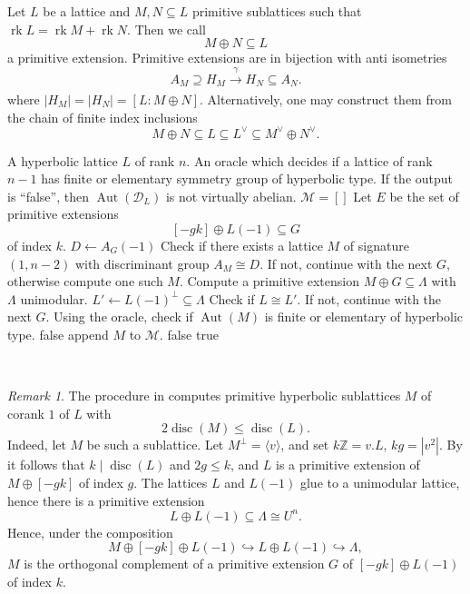 \documentclass[11pt,letterpaper]{amsart}
\DeclareMathOperator{\rk}{rk}
\DeclareMathOperator{\Aut}{Aut}
\DeclareMathOperator{\disc}{disc}
\newcommand{\ZZ}{\mathbb{Z}}
\theoremstyle{definition}
\theoremstyle{remark}
\newtheorem{remark}[theorem]{Remark}
\begin{document}
Let $L$ be a lattice and $M,N \subseteq L$ primitive sublattices such that $\rk L = \rk M+ \rk N$. 
Then we call 
\[M\oplus N \subseteq L\]
a primitive extension. Primitive extensions are in bijection with anti isometries
\[A_M \supseteq H_M \xrightarrow[]{\gamma} H_N \subseteq A_N.\]
where $|H_M|=|H_N|=[L:M \oplus N]$.
Alternatively, one may construct them from the chain of finite index inclusions 
\[M\oplus N \subseteq L \subseteq L^\vee \subseteq M^\vee \oplus N^\vee.\]
\begingroup
{}\label{alg:sublattice}
\endgroup
\begin{algorithmic}[1]
\REQUIRE A hyperbolic lattice $L$ of rank $n$. An oracle which decides if a lattice of rank $n-1$ has finite or elementary symmetry group of hyperbolic type. 
\ENSURE If the output is ``false'', then $\Aut(\mathcal{D}_L)$ is not virtually abelian.
 \STATE $\mathcal{M} = []$
 \FOR{$k \mid \disc(L)$}
   \STATE Let $E$ be the set of primitive extensions
   \[[-gk]\oplus L(-1) \subseteq G\] 
   of index $k$.
     \STATE $D \gets A_G(-1)$
     \STATE Check if there exists a lattice $M$ of signature $(1,n-2)$ with discriminant group $A_M \cong D$. If not, continue with the next $G$, otherwise compute one such $M$.
     \STATE Compute a primitive extension $M \oplus G \subseteq \Lambda$ with $\Lambda$ unimodular.
     \STATE $L' \gets L(-1)^\perp \subseteq \Lambda$
     \STATE Check if $L \cong L'$. If not, continue with the next $G$.  
     \STATE Using the oracle, check if $\Aut(M)$ is finite or elementary of hyperbolic type. 
     \IF{$\Aut(\mathcal{D}_M)$ is not finite or hyperbolic}
       \RETURN false \label{line:not finite or hyperbolic}
     \ENDIF
     \label{line:M-represents-0-2}
         \STATE append $M$ to $\mathcal{M}$.
     \ENDIF
         \RETURN false \label{line:two-test}
       \ENDIF
    \ENDIF
    \ENDFOR
  \ENDFOR
\ENDFOR
\RETURN true
\end{algorithmic}\hrulefill\\
\begin{remark}\label{rem.explain_sublattice_test}
The procedure in  computes primitive  hyperbolic sublattices $M$ of corank $1$ of $L$ with \[2\disc(M)\le \disc(L).\] Indeed, let $M$ be such a sublattice. Let $M^\perp = \langle v \rangle$, and set $k\ZZ = v.L$, $kg = |v^2|$. By  it follows that $k\mid \disc(L)$ and $2g \le k$, and $L$ is a primitive extension of $M\oplus [ -gk]$ of index $g$. The lattices $L$ and $L(-1)$ glue to a unimodular lattice, hence there is a primitive extension 
\[L \oplus L(-1) \subseteq \Lambda \cong U^{n}.\] 
Hence, under the composition \[ M \oplus [-gk] \oplus L(-1) \hookrightarrow L \oplus L(-1)\hookrightarrow \Lambda,\] $M$ is the orthogonal complement of a primitive extension $G$ of $[-gk]\oplus L(-1)$ of index $k$. 
\end{remark}
\end{document}
